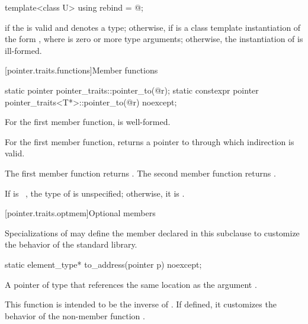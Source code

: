 %
\begin{itemdecl}
template<class U> using rebind = @\seebelow@;
\end{itemdecl}

\begin{itemdescr}
\pnum
\templalias {} if
the   is valid and denotes a
type; otherwise,
 if
 is a class template instantiation of the form ,
where  is zero or more type arguments; otherwise, the instantiation of
 is ill-formed.
\end{itemdescr}

[pointer.traits.functions]{Member functions}

%
\begin{itemdecl}
static pointer pointer_traits::pointer_to(@\seebelow@ r);
static constexpr pointer pointer_traits<T*>::pointer_to(@\seebelow@ r) noexcept;
\end{itemdecl}

\begin{itemdescr}
\pnum
\mandates
For the first member function,
 is well-formed.

\pnum
\expects
For the first member function,
 returns a pointer to 
through which indirection is valid.

\pnum
\returns
The first member function returns .
The second member function returns .

\pnum
\remarks
If  is \cv{}~, the type of
 is unspecified; otherwise, it is .
\end{itemdescr}

[pointer.traits.optmem]{Optional members}

\pnum
Specializations of  may define the member declared
in this subclause to customize the behavior of the standard library.

%
\begin{itemdecl}
static element_type* to_address(pointer p) noexcept;
\end{itemdecl}

\begin{itemdescr}
\pnum
\returns
A pointer of type  that references
the same location as the argument .

\pnum
\begin{note}
This function is intended to be the inverse of .
If defined, it customizes the behavior of
the non-member function
.
\end{note}
\end{itemdescr}


